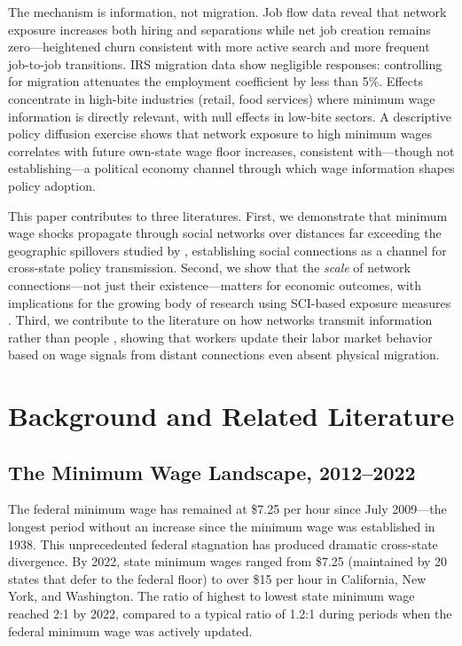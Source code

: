 \documentclass[12pt]{article}
\begin{document}
The mechanism is information, not migration. Job flow data reveal that network exposure increases both hiring and separations while net job creation remains zero---heightened churn consistent with more active search and more frequent job-to-job transitions. IRS migration data show negligible responses: controlling for migration attenuates the employment coefficient by less than 5\%. Effects concentrate in high-bite industries (retail, food services) where minimum wage information is directly relevant, with null effects in low-bite sectors. A descriptive policy diffusion exercise shows that network exposure to high minimum wages correlates with future own-state wage floor increases, consistent with---though not establishing---a political economy channel through which wage information shapes policy adoption.

This paper contributes to three literatures. First, we demonstrate that minimum wage shocks propagate through social networks over distances far exceeding the geographic spillovers studied by \citet{dube2014designing}, establishing social connections as a channel for cross-state policy transmission. Second, we show that the \textit{scale} of network connections---not just their existence---matters for economic outcomes, with implications for the growing body of research using SCI-based exposure measures \citep{bailey2018social, bailey2018house, chetty2022social}. Third, we contribute to the literature on how networks transmit information rather than people \citep{jager2024worker, kramarz2023, faberman2022}, showing that workers update their labor market behavior based on wage signals from distant connections even absent physical migration.


\section{Background and Related Literature}
\label{sec:background}

\subsection{The Minimum Wage Landscape, 2012--2022}

The federal minimum wage has remained at \$7.25 per hour since July 2009---the longest period without an increase since the minimum wage was established in 1938. This unprecedented federal stagnation has produced dramatic cross-state divergence. By 2022, state minimum wages ranged from \$7.25 (maintained by 20 states that defer to the federal floor) to over \$15 per hour in California, New York, and Washington. The ratio of highest to lowest state minimum wage reached 2:1 by 2022, compared to a typical ratio of 1.2:1 during periods when the federal minimum wage was actively updated.
\end{document}
